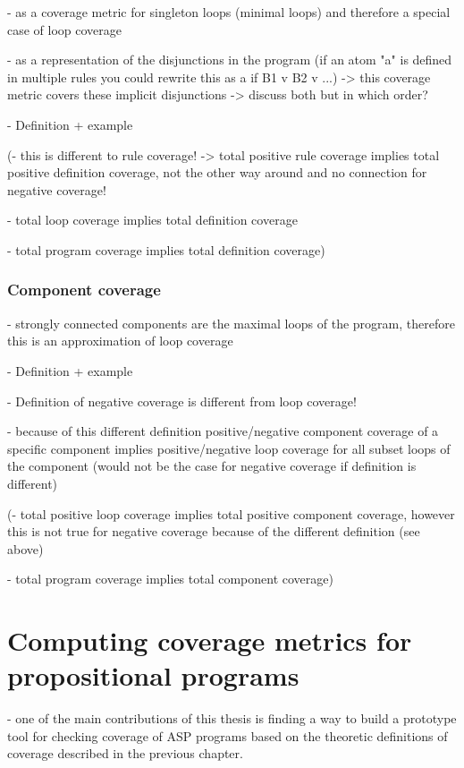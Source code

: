     - as a coverage metric for singleton loops (minimal loops) and therefore a special case of loop coverage

    - as a representation of the disjunctions in the program (if an atom "a" is defined in multiple rules you could rewrite 
    this as a if B1 v B2 v ...) -> this coverage metric covers these implicit disjunctions
-> discuss both but in which order?

- Definition + example

(- this is different to rule coverage! -> total positive rule coverage implies total positive definition coverage, not the other 
way around and no connection for negative coverage!

- total loop coverage implies total definition coverage

- total program coverage implies total definition coverage)

\subsection{Component coverage}
\label{subsec:Coverage cetrics/Branch-like coverage/Component coverage}
- strongly connected components are the maximal loops of the program, therefore this is an approximation of loop coverage

- Definition + example

- Definition of negative coverage is different from loop coverage!

- because of this different definition positive/negative component coverage of a specific component implies positive/negative loop 
coverage for all subset loops of the component (would not be the case for negative coverage if definition is different)

(- total positive loop coverage implies total positive component coverage, however this is not true for negative coverage because 
of the different definition (see above)

- total program coverage implies total component coverage)

\chapter{Computing coverage metrics for propositional programs}
\label{ch:Computing coverage metrics for propositional programs}
- one of the main contributions of this thesis is finding a way to build a prototype tool for checking coverage of ASP programs 
based on the theoretic definitions of coverage described in the previous chapter.


